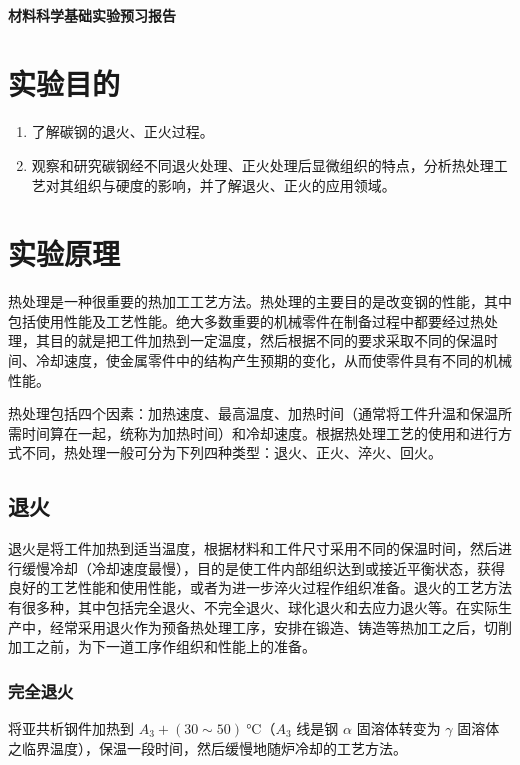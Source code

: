 \documentclass[a4paper,utf8]{article}
\begin{document}
\begin{center}
    {\mbox{}\\[7em]\bfseries\songti%
    材料科学基础实验预习报告}\\[34mm]
\end{center}
\newpage
\section{实验目的}
    \begin{enumerate}
        \item 了解碳钢的退火、正火过程。
        \item 观察和研究碳钢经不同退火处理、正火处理后显微组织的特点，分析热处理工艺对其组织与硬度的影响，并了解退火、正火的应用领域。
    \end{enumerate}
\section{实验原理}%
    热处理是一种很重要的热加工工艺方法。热处理的主要目的是改变钢的性能，其中包括使用性能及工艺性能。绝大多数重要的机械零件在制备过程中都要经过热处理，其目的就是把工件加热到一定温度，然后根据不同的要求采取不同的保温时间、冷却速度，使金属零件中的结构产生预期的变化，从而使零件具有不同的机械性能。\par
    热处理包括四个因素：加热速度、最高温度、加热时间（通常将工件升温和保温所需时间算在一起，统称为加热时间）和冷却速度。根据热处理工艺的使用和进行方式不同，热处理一般可分为下列四种类型：退火、正火、淬火、回火。\par
    \subsection{退火}
        退火是将工件加热到适当温度，根据材料和工件尺寸采用不同的保温时间，然后进行缓慢冷却（冷却速度最慢），目的是使工件内部组织达到或接近平衡状态，获得良好的工艺性能和使用性能，或者为进一步淬火过程作组织准备。退火的工艺方法有很多种，其中包括完全退火、不完全退火、球化退火和去应力退火等。在实际生产中，经常采用退火作为预备热处理工序，安排在锻造、铸造等热加工之后，切削加工之前，为下一道工序作组织和性能上的准备。
        \subsubsection{完全退火}
            将亚共析钢件加热到 $A_3+(30\sim 50)~\unit{\degreeCelsius}$（$A_3$ 线是钢 $\alpha$ 固溶体转变为 $\gamma$ 固溶体之临界温度），保温一段时间，然后缓慢地随炉冷却的工艺方法。
\end{document}
